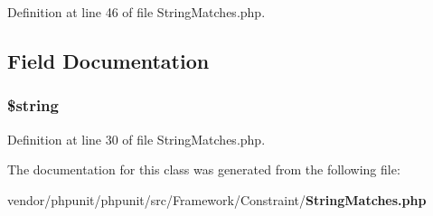 Definition at line 46 of file String\+Matches.\+php.



\subsection{Field Documentation}
\subsubsection[{\$string}]{\setlength{\rightskip}{0pt plus 5cm}\$string\hspace{0.3cm}{\ttfamily [protected]}}\label{class_p_h_p_unit___framework___constraint___string_matches_a05bc82187ba145848edd864852f4bd37}


Definition at line 30 of file String\+Matches.\+php.



The documentation for this class was generated from the following file\+:\begin{DoxyCompactItemize}
\item 
vendor/phpunit/phpunit/src/\+Framework/\+Constraint/{\bf String\+Matches.\+php}\end{DoxyCompactItemize}
